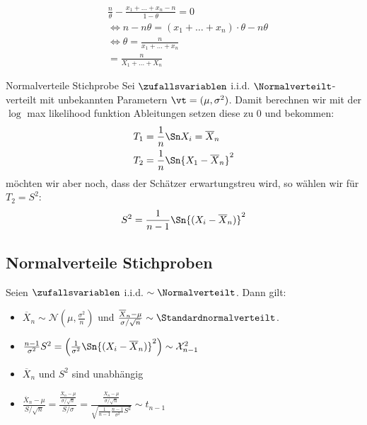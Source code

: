 \begin{align*}
   & \frac{n}{\theta} - \frac{x_1 + \ldots + x_n - n}{1 - \theta} = 0               \\
   & \Longleftrightarrow n - n\theta =  (x_1 + \ldots + x_n) \cdot \theta - n\theta \\
   & \Longleftrightarrow \theta = \frac{n}{x_1 + \ldots + x_n}                      \\
   & = \frac{n}{X_1 + \ldots + X_n}
\end{align*}

\BoxEnd{}

\begin{definition}{Normalverteile Stichprobe}
  Sei $\zufallsvariablen$ i.i.d. $\Normalverteilt$-verteilt mit unbekannten
  Parametern $\vt = (\mu, \sigma^2)$. Damit berechnen wir mit der $\log$ max
  likelihood funktion Ableitungen setzen diese zu $0$ und bekommen:
  \begin{align*}
    T_1 & = \frac{1}{n} \Sn X_i = \overline{X}_n     \\
    T_2 & = \frac{1}{n} \Sn {X_1 - \overline{X}_n}^2
  \end{align*}
  möchten wir aber noch, dass der Schätzer erwartungstreu wird,
  so wählen wir für $T_2 = S^2$:
  \begin{align*}
    S^2 = \frac{1}{n-1} \Sn  {(X_i - \overline{X}_n)}^2
  \end{align*}
\end{definition}
\subsection{Normalverteile Stichproben}
Seien $\zufallsvariablen$ i.i.d. $\sim \Normalverteilt$. Dann gilt:
\begin{itemize}
  \item $\overline{X}_n \sim \mathcal{N} (\mu, \frac{\sigma^2}{n})$
        und $\frac{\overline{X}_n - \mu}{\sigma / \sqrt{n}} \sim \Standardnormalverteilt$.
  \item $\frac{n-1}{\sigma^2} S^2 = \left( \frac{1}{\sigma^2} \Sn  {(X_i - \overline{X}_n)}^2 \right) \sim \mathcal{X}^2_{n-1}$
  \item $\overline{X}_n$ und $S^2$ sind unabhängig
  \item $\frac{\overline{X}_n - \mu}{S / \sqrt{n}} = \frac{ \frac{\overline{X}_n - \mu}{\sigma / \sqrt{n}} }{S / \sigma} = \frac{ \frac{\overline{X}_n - \mu}{\sigma / \sqrt{n}} }{\sqrt{\frac{1}{n-1} \frac{n-1}{\sigma^2} S^2}} \sim t_{n-1}$
\end{itemize}
